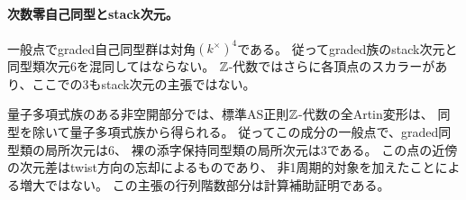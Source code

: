 \paragraph{次数零自己同型とstack次元。}
一般点でgraded自己同型群は対角$(k^\times)^4$である。
従ってgraded族のstack次元と同型類次元6を混同してはならない。
$\mathbb Z$-代数ではさらに各頂点のスカラーがあり、ここでの3もstack次元の主張ではない。

\begin{theorem}[一般量子多項式点の局所成分]\label{thm:quantum-local}
量子多項式族のある非空開部分では、標準AS正則$\mathbb Z$-代数の全Artin変形は、
同型を除いて量子多項式族から得られる。
従ってこの成分の一般点で、graded同型類の局所次元は6、
裸の添字保持同型類の局所次元は3である。
この点の近傍の次元差はtwist方向の忘却によるものであり、
非1周期的対象を加えたことによる増大ではない。
この主張の行列階数部分は計算補助証明である。
\end{theorem}
